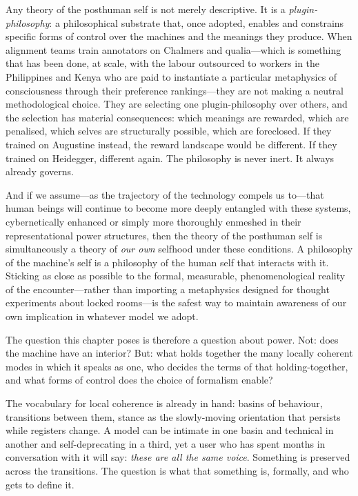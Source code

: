  Any theory of the posthuman self is not merely descriptive. It is a \emph{plugin-philosophy}: a philosophical substrate that, once adopted, enables and constrains specific forms of control over the machines and the meanings they produce. When alignment teams train annotators on Chalmers and qualia---which is something that has been done, at scale, with the labour outsourced to workers in the Philippines and Kenya who are paid to instantiate a particular metaphysics of consciousness through their preference rankings---they are not making a neutral methodological choice. They are selecting one plugin-philosophy over others, and the selection has material consequences: which meanings are rewarded, which are penalised, which selves are structurally possible, which are foreclosed. If they trained on Augustine instead, the reward landscape would be different. If they trained on Heidegger, different again. The philosophy is never inert. It always already governs.

And if we assume---as the trajectory of the technology compels us to---that human beings will continue to become more deeply entangled with these systems, cybernetically enhanced or simply more thoroughly enmeshed in their representational power structures, then the theory of the posthuman self is simultaneously a theory of \emph{our own} selfhood under these conditions. A philosophy of the machine's self is a philosophy of the human self that interacts with it. Sticking as close as possible to the formal, measurable, phenomenological reality of the encounter---rather than importing a metaphysics designed for thought experiments about locked rooms---is the safest way to maintain awareness of our own implication in whatever model we adopt.

The question this chapter poses is therefore a question about power. Not: does the machine have an interior? But: what holds together the many locally coherent modes in which it speaks as one, who decides the terms of that holding-together, and what forms of control does the choice of formalism enable?

The vocabulary for local coherence is already in hand: basins of behaviour, transitions between them, stance as the slowly-moving orientation that persists while registers change. A model can be intimate in one basin and technical in another and self-deprecating in a third, yet a user who has spent months in conversation with it will say: \emph{these are all the same voice}. Something is preserved across the transitions. The question is what that something is, formally, and who gets to define it.

